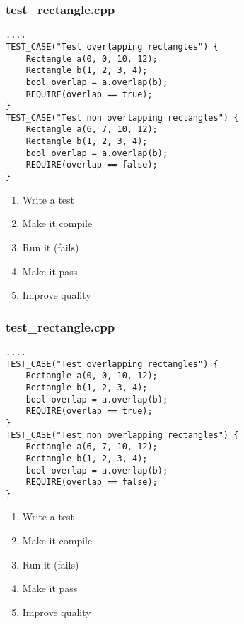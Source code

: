 \begin{frame}[fragile]
\frametitle{test\_rectangle.cpp}
\begin{minipage}[t]{0.48\linewidth}
\begin{lstlisting}
....
TEST_CASE("Test overlapping rectangles") {
    Rectangle a(0, 0, 10, 12);
    Rectangle b(1, 2, 3, 4);
    bool overlap = a.overlap(b);
    REQUIRE(overlap == true);
}
TEST_CASE("Test non overlapping rectangles") {
    Rectangle a(6, 7, 10, 12);
    Rectangle b(1, 2, 3, 4);
    bool overlap = a.overlap(b);
    REQUIRE(overlap == false);
}
\end{lstlisting}
\end{minipage}\hfill
\begin{minipage}[t]{0.28\linewidth}
  \small
  \begin{enumerate} 
    \item \textcolor{deadcolor}{Write a test}
    \item \textcolor{deadcolor}{Make it compile}
    \item \textcolor{deadcolor}{Run it (fails)}
    \item \textcolor{deadcolor}{Make it pass}
    \item \textcolor{activecolor}{Improve quality}
  \end{enumerate} 
\end{minipage}
\end{frame}

\begin{frame}[fragile]
\frametitle{test\_rectangle.cpp}
\begin{minipage}[t]{0.48\linewidth}
\begin{lstlisting}
....
TEST_CASE("Test overlapping rectangles") {
    Rectangle a(0, 0, 10, 12);
    Rectangle b(1, 2, 3, 4);
    bool overlap = a.overlap(b);
    REQUIRE(overlap == true);
}
TEST_CASE("Test non overlapping rectangles") {
    Rectangle a(6, 7, 10, 12);
    Rectangle b(1, 2, 3, 4);
    bool overlap = a.overlap(b);
    REQUIRE(overlap == false);
}
\end{lstlisting}
\end{minipage}\hfill
\begin{minipage}[t]{0.28\linewidth}
  \small
  \begin{enumerate} 
    \item \textcolor{activecolor}{Write a test}
    \item \textcolor{deadcolor}{Make it compile}
    \item \textcolor{deadcolor}{Run it (fails)}
    \item \textcolor{deadcolor}{Make it pass}
    \item \textcolor{deadcolor}{Improve quality}
  \end{enumerate} 
\end{minipage}
\end{frame}


